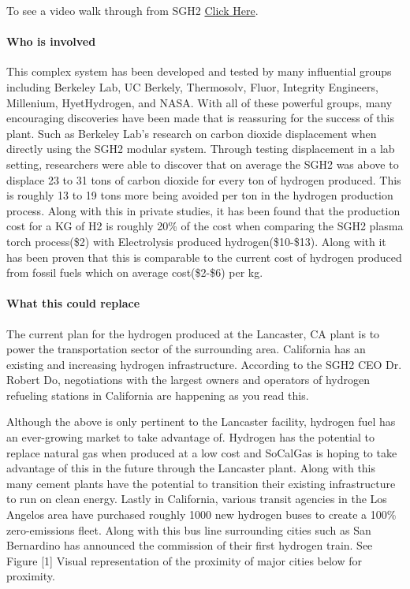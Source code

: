 \documentclass[3p,sort]{elsarticle}
\begin{document}
To see a video walk through from SGH2 \href{https://vimeo.com/411145543}{Click Here}.

\citep{sgh2-ca, sgh2site}

\paragraph{Who is involved} This complex system has been developed and tested by many influential 
groups including Berkeley Lab, UC Berkely, Thermosolv, Fluor, 
Integrity Engineers, Millenium, HyetHydrogen, and NASA. With all of these powerful groups, 
many encouraging discoveries have been made that is reassuring for the success of this plant. 
Such as Berkeley Lab's research on carbon dioxide displacement when directly using the 
SGH2 modular system. Through testing displacement in a lab setting, researchers were able to 
discover that on average the SGH2 was above to displace 23 to 31 tons of carbon dioxide for 
every ton of hydrogen produced. This is roughly 13 to 19 tons more  being avoided per 
ton in the hydrogen production process. Along with this in private studies, it has been found 
that the production cost for a KG of H2 
is roughly 20\% of the cost when comparing the SGH2 plasma torch process(\$2) with Electrolysis 
produced hydrogen(\$10-\$13). Along with it has been proven that this is comparable to the current 
cost of hydrogen produced from fossil fuels which on average cost(\$2-\$6) per kg.

\cite{sgh2site, isegoria}

\paragraph{What this could replace} The current plan for the hydrogen produced at the Lancaster, CA 
plant is to power the transportation sector of the surrounding area. 
California has an existing and increasing hydrogen infrastructure. According to the SGH2 CEO Dr. 
Robert Do, negotiations with the largest 
owners and operators of hydrogen refueling stations in California are happening as you read this. 

Although the above is only pertinent to the Lancaster facility, hydrogen fuel has an ever-growing 
market to take advantage of. Hydrogen has 
the potential to replace natural gas when produced at a low cost and SoCalGas is hoping to take 
advantage of this in the future through the 
Lancaster plant. Along with this many cement plants have the potential to transition their existing 
infrastructure to run on clean energy. 
Lastly in California, various transit agencies in the Los Angelos area have purchased roughly 1000 
new hydrogen buses to create a 100\% 
zero-emissions fleet. Along with this bus line surrounding cities such as San Bernardino has 
announced the commission of their first hydrogen train. See Figure [1] Visual representation of the proximity of major cities below for proximity.
\end{document}
